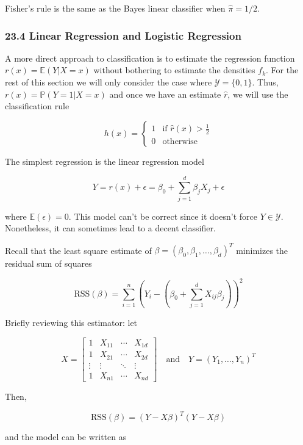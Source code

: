 Fisher's rule is the same as the Bayes linear classifier when
\(\hat{\pi} = 1/2\).

\subsubsection{23.4 Linear Regression and Logistic Regression}\label{linear-regression-and-logistic-regression}

A more direct approach to classification is to estimate the regression
function \(r(x) = \mathbb{E}(Y | X = x)\) without bothering to estimate
the densities \(f_k\). For the rest of this section we will only
consider the case where \(\mathcal{Y} = \{ 0, 1 \}\). Thus,
\(r(x) = \mathbb{P}(Y = 1 | X = x)\) and once we have an estimate
\(\hat{r}\), we will use the classification rule

\[ 
h(x) = \begin{cases}
1 &\text{if } \hat{r}(x) > \frac{1}{2} \\
0 &\text{otherwise}
\end{cases} 
\]

The simplest regression is the linear regression model

\[ Y = r(x) + \epsilon = \beta_0 + \sum_{j=1}^d \beta_j X_j + \epsilon \]

where \(\mathbb{E}(\epsilon) = 0\). This model can't be correct since it
doesn't force \(Y \in \mathcal{Y}\). Nonetheless, it can sometimes lead
to a decent classifier.

Recall that the least square estimate of
\(\beta = (\beta_0, \beta_1, \dots, \beta_d)^T\) minimizes the residual
sum of squares

\[ \text{RSS}(\beta) = \sum_{i=1}^n \left( Y_i - \left( \beta_0  + \sum_{j=1}^d X_{ij} \beta_j \right) \right)^2 \]

Briefly reviewing this estimator: let

\[ 
X = \begin{bmatrix}
1 & X_{11} & \cdots & X_{1d} \\
1 & X_{21} & \cdots & X_{2d} \\
\vdots & \vdots & \ddots & \vdots \\
1 & X_{n1} & \cdots & X_{nd}
\end{bmatrix}
\quad \text{and} \quad
Y = (Y_1, \dots, Y_n)^T
\]

Then,

\[ \text{RSS}(\beta) = (Y - X \beta)^T (Y - X \beta) \]

and the model can be written as

